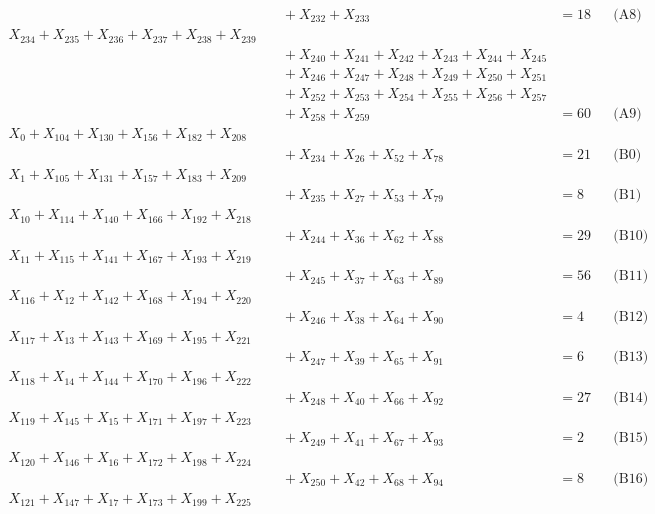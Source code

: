 \documentclass[a4paper,10pt]{article}
\begin{document}
{\begin{align}
&\quad  + X_{232} + X_{233} &= 18 && \text{(A8)} \\
X_{234} + X_{235} + X_{236} + X_{237} + X_{238} + X_{239} \\[0.5ex]
&\quad  + X_{240} + X_{241} + X_{242} + X_{243} + X_{244} + X_{245} \\[0.5ex]
&\quad  + X_{246} + X_{247} + X_{248} + X_{249} + X_{250} + X_{251} \\[0.5ex]
&\quad  + X_{252} + X_{253} + X_{254} + X_{255} + X_{256} + X_{257} \\[0.5ex]
&\quad  + X_{258} + X_{259} &= 60 && \text{(A9)} \\
X_{0} + X_{104} + X_{130} + X_{156} + X_{182} + X_{208} \\[0.5ex]
&\quad  + X_{234} + X_{26} + X_{52} + X_{78} &= 21 && \text{(B0)} \\
X_{1} + X_{105} + X_{131} + X_{157} + X_{183} + X_{209} \\[0.5ex]
&\quad  + X_{235} + X_{27} + X_{53} + X_{79} &= 8 && \text{(B1)} \\
X_{10} + X_{114} + X_{140} + X_{166} + X_{192} + X_{218} \\[0.5ex]
&\quad  + X_{244} + X_{36} + X_{62} + X_{88} &= 29 && \text{(B10)} \\
X_{11} + X_{115} + X_{141} + X_{167} + X_{193} + X_{219} \\[0.5ex]
&\quad  + X_{245} + X_{37} + X_{63} + X_{89} &= 56 && \text{(B11)} \\
X_{116} + X_{12} + X_{142} + X_{168} + X_{194} + X_{220} \\[0.5ex]
&\quad  + X_{246} + X_{38} + X_{64} + X_{90} &= 4 && \text{(B12)} \\
X_{117} + X_{13} + X_{143} + X_{169} + X_{195} + X_{221} \\[0.5ex]
&\quad  + X_{247} + X_{39} + X_{65} + X_{91} &= 6 && \text{(B13)} \\
X_{118} + X_{14} + X_{144} + X_{170} + X_{196} + X_{222} \\[0.5ex]
&\quad  + X_{248} + X_{40} + X_{66} + X_{92} &= 27 && \text{(B14)} \\
X_{119} + X_{145} + X_{15} + X_{171} + X_{197} + X_{223} \\[0.5ex]
&\quad  + X_{249} + X_{41} + X_{67} + X_{93} &= 2 && \text{(B15)} \\
X_{120} + X_{146} + X_{16} + X_{172} + X_{198} + X_{224} \\[0.5ex]
&\quad  + X_{250} + X_{42} + X_{68} + X_{94} &= 8 && \text{(B16)} \\
X_{121} + X_{147} + X_{17} + X_{173} + X_{199} + X_{225} \\[0.5ex]

\end{align}}
\end{document}

